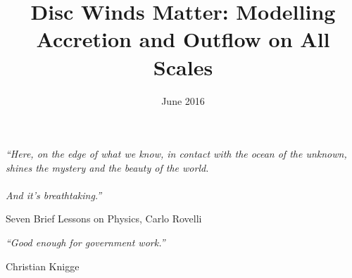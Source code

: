 \documentclass[a4paper, 11pt, twoside]{Thesis}  %
\begin{document}
\frontmatter      %

\title  {Disc Winds Matter: Modelling Accretion and Outflow on All Scales}
\addresses  {\groupname\\\deptname\\\univname}  %
\date       {June 2016}
\subject    {}
\keywords   {}

\maketitle


\fancyhead{}  %
\rhead{\thepage}  %
\lhead{}  %

\pagestyle{fancy}  %

\pagestyle{empty}  %

\null\vfill
\textit{``Here, on the edge of what we know, in contact with the ocean of the unknown, shines the mystery and the beauty of the world.\\\\And it's breathtaking.''}

\begin{flushright}
Seven Brief Lessons on Physics, Carlo Rovelli
\end{flushright}

\textit{``Good enough for government work.''}

\begin{flushright}
Christian Knigge
\end{flushright}

\vfill\vfill\vfill\vfill\vfill\vfill\null
\end{document}

